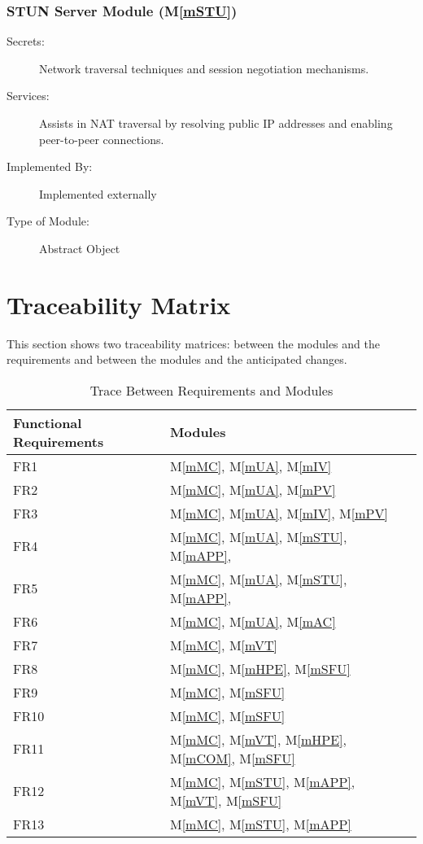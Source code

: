 \documentclass[12pt, titlepage]{article}
\newcommand{\mref}[1]{M\ref{#1}}
\begin{document}
\subsubsection{STUN Server Module (\mref{mSTU})}

\begin{description}
\item[Secrets:] Network traversal techniques and session negotiation mechanisms.
\item[Services:] Assists in NAT traversal by resolving public IP addresses and enabling peer-to-peer connections.
\item[Implemented By:] Implemented externally
\item[Type of Module:] Abstract Object
\end{description}

\section{Traceability Matrix} \label{SecTM}

This section shows two traceability matrices: between the modules and the
requirements and between the modules and the anticipated changes.

\begin{table}[H]
\centering
\begin{tabular}{p{} p{}}
\toprule
\textbf{Functional Requirements} & \textbf{Modules}\\
\midrule
FR1 & \mref{mMC}, \mref{mUA}, \mref{mIV}\\
FR2 & \mref{mMC}, \mref{mUA}, \mref{mPV}\\
FR3 & \mref{mMC}, \mref{mUA}, \mref{mIV}, \mref{mPV}\\
FR4 & \mref{mMC}, \mref{mUA}, \mref{mSTU}, \mref{mAPP},\\
FR5 & \mref{mMC}, \mref{mUA}, \mref{mSTU}, \mref{mAPP},\\
FR6 & \mref{mMC}, \mref{mUA}, \mref{mAC}\\
FR7 & \mref{mMC}, \mref{mVT}\\
FR8 & \mref{mMC}, \mref{mHPE}, \mref{mSFU}\\
FR9 & \mref{mMC}, \mref{mSFU}\\
FR10 & \mref{mMC}, \mref{mSFU}\\
FR11 & \mref{mMC}, \mref{mVT}, \mref{mHPE}, \mref{mCOM}, \mref{mSFU}\\
FR12 & \mref{mMC}, \mref{mSTU}, \mref{mAPP}, \mref{mVT}, \mref{mSFU}\\
FR13 & \mref{mMC}, \mref{mSTU}, \mref{mAPP}\\
\bottomrule
\end{tabular}
\caption{Trace Between Requirements and Modules}
\label{TblRT}
\end{table}
\end{document}
